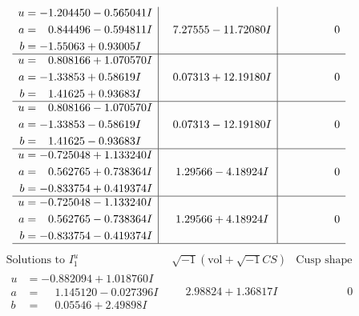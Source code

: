 \documentclass[1p]{elsarticle_modified}
\theoremstyle{definition}
\newcommand{\I}{\sqrt{-1}}
\begin{document}
$$\begin{array}{c|c|c}
\begin{aligned}
u &= -1.204450 - 0.565041 I \\
a &= \phantom{-}0.844496 - 0.594811 I \\
b &= -1.55063 + 0.93005 I\end{aligned}
 & \phantom{-}7.27555 - 11.72080 I & \phantom{-0.000000 } 0 \\ \hline\begin{aligned}
u &= \phantom{-}0.808166 + 1.070570 I \\
a &= -1.33853 + 0.58619 I \\
b &= \phantom{-}1.41625 + 0.93683 I\end{aligned}
 & \phantom{-}0.07313 + 12.19180 I & \phantom{-0.000000 } 0 \\ \hline\begin{aligned}
u &= \phantom{-}0.808166 - 1.070570 I \\
a &= -1.33853 - 0.58619 I \\
b &= \phantom{-}1.41625 - 0.93683 I\end{aligned}
 & \phantom{-}0.07313 - 12.19180 I & \phantom{-0.000000 } 0 \\ \hline\begin{aligned}
u &= -0.725048 + 1.133240 I \\
a &= \phantom{-}0.562765 + 0.738364 I \\
b &= -0.833754 + 0.419374 I\end{aligned}
 & \phantom{-}1.29566 - 4.18924 I & \phantom{-0.000000 } 0 \\ \hline\begin{aligned}
u &= -0.725048 - 1.133240 I \\
a &= \phantom{-}0.562765 - 0.738364 I \\
b &= -0.833754 - 0.419374 I\end{aligned}
 & \phantom{-}1.29566 + 4.18924 I & \phantom{-0.000000 } 0\\
 \hline 
 \end{array}$$\newpage$$\begin{array}{c|c|c}  
\text{Solutions to }I^u_{1}& \I (\text{vol} + \sqrt{-1}CS) & \text{Cusp shape}\\
 \hline 
\begin{aligned}
u &= -0.882094 + 1.018760 I \\
a &= \phantom{-}1.145120 - 0.027396 I \\
b &= \phantom{-}0.05546 + 2.49898 I\end{aligned}
 & \phantom{-}2.98824 + 1.36817 I & \phantom{-0.000000 } 0 \\ \hline\begin{aligned}

\end{aligned}
\end{array}$$
\end{document}
